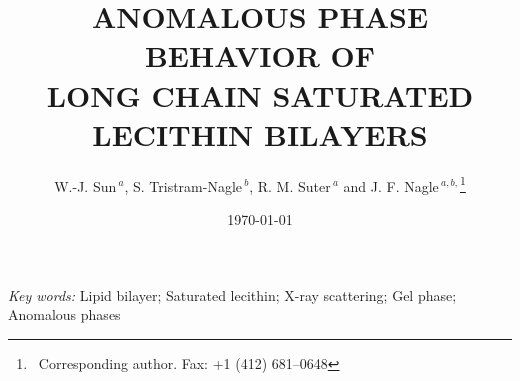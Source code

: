 
%
%

\begin{titlepage}
\vspace{160pt}
\title{ANOMALOUS PHASE BEHAVIOR OF\protect\\
LONG CHAIN SATURATED LECITHIN BILAYERS
}
\author{W.-J. Sun$^{\ a}$, S. Tristram-Nagle$^{\ b}$, R. M. Suter$^{\ a}$ and 
J. F. Nagle$^{\ a,b,}$\footnote{\ Corresponding author. Fax: +1 (412) 681--0648}}
\address{$^{\ a}$Departments of Physics and $^{\ b}$Biological Sciences,
\protect\\
 Carnegie Mellon University , Pittsburgh, PA 15213
}
\date{\today}

\begin{flushleft}
\textit{Key words:} Lipid bilayer; Saturated lecithin; X-ray scattering;
Gel phase; Anomalous phases
\end{flushleft}
\maketitle
\end{titlepage}
\newpage

